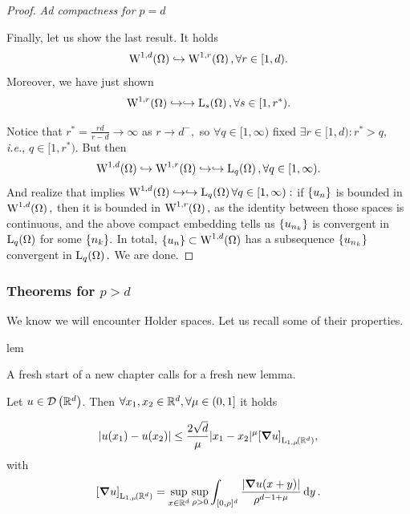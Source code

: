 \documentclass{article}
\begin{document}
\begin{proof}
	\textit{Ad compactness for $p=d$}

	Finally, let us show the last result. It holds
	\[
		\WkpSet[1][d]{\Omega} \hookrightarrow \WkpSet[1][r]{\Omega}, \forall r \in [1,d).
	\]
	Moreover, we have just shown
	\[
		\WkpSet[1][r]{\Omega} \hookrightarrow \hookrightarrow \LpSet[s]{\Omega}, \forall s \in [1,r^{*}).
	\]

	Notice that $r^{*} = \frac{rd}{r-d} \to \infty$ as $r \to d^-,$ so $\forall q \in [1,\infty)$ fixed $\exists r \in [1,d): r^{*} > q,$ \textit{i.e.}, $q \in [1, r^{*}).$ But then
	\[
		\WkpSet[1][d]{\Omega} \hookrightarrow \WkpSet[1][r]{\Omega} \hookrightarrow \hookrightarrow \LpSet[q]{\Omega}, \forall q \in [1,\infty).
	\]
	And realize that implies $\WkpSet[1][d]{\Omega} \hookrightarrow \hookrightarrow \LpSet[q]{\Omega} \forall q \in [1,\infty):$ if $\qty{u_n}$ is bounded in $\WkpSet[1][d]{\Omega},$ then it is bounded in $\WkpSet[1][r]{\Omega},$ as the identity between those spaces is continuous, and the above compact embedding tells us $\qty{u_{n_k}}$ is convergent in $\LpSet[q]{\Omega}$ for some $\qty{n_k}.$ In total, $\qty{u_n} \subset \WkpSet[1][d]{\Omega}$ has a subsequence $\qty{u_{n_k}}$ convergent in $\LpSet[q]{\Omega}.$ We are done.
\end{proof}

\subsubsection{Theorems for $p>d$}
\label{sec:emedding_p_ge_q}
We know we will encounter Holder spaces. Let us recall some of their properties.


lem

A fresh start of a new chapter calls for a fresh new lemma.

\begin{lemma}[Morrey]
	Let $u \in \mathcal{D}\!\,\left({\mathbb R}^{d} \right)$. Then $\forall x_1, x_2 \in {\mathbb R}^{d}, \forall \mu \in (0,1]$ it holds

	\[
		|u(x_1) - u(x_2)| \leq \frac{2 \sqrt{d}}{\mu}|x_1 - x_2|^{\mu} \qty[\grad u]_{\LpSet[1,\mu]{\R^{d}}},
	\]
	with
	\[
		\qty[\grad u]_{\LpSet[1,\mu]{\R^{d}}} = \sup_{x \in \R^{d}} \sup_{\rho >0} \int_{[0,\rho]^d}\frac{|\grad u(x+y)|}{\rho^{d-1+\mu}}\dd{y}.
	\]
\end{lemma}
\end{document}
